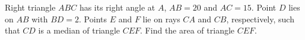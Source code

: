 Right triangle $ABC$ has its right angle at $A$, $AB=20$ and $AC=15$. Point $D$ lies on $AB$ with $BD=2$. Points $E$ and $F$ lie on rays $CA$ and $CB$, respectively, such that $CD$ is a median of triangle $CEF$. Find the area of triangle $CEF$.
